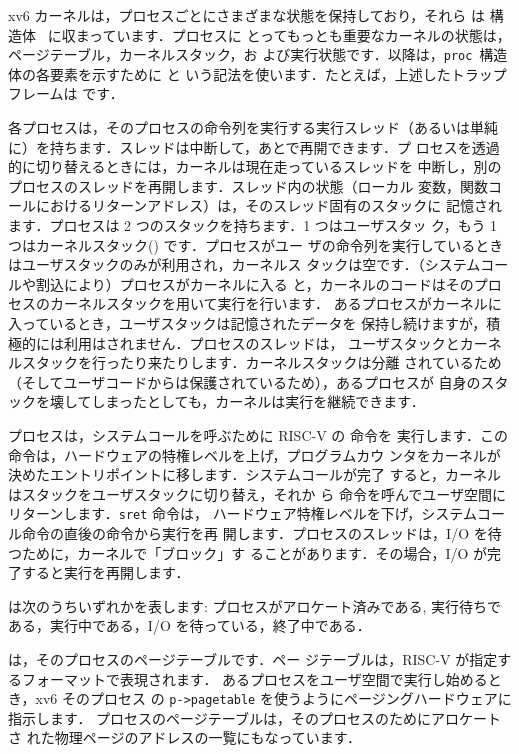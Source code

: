 xv6 カーネルは，プロセスごとにさまざまな状態を保持しており，それら
は 構造体~ に収まっています．プロセスに
とってもっとも重要なカーネルの状態は，ページテーブル，カーネルスタック，お
よび実行状態です．以降は，\lstinline{proc}~構造体の各要素を示すために と
いう記法を使います．たとえば，上述したトラップフレームは  です．

各プロセスは，そのプロセスの命令列を実行する実行スレッド（あるいは単純
に）を持ちます．スレッドは中断して，あとで再開できます．プ
ロセスを透過的に切り替えるときには，カーネルは現在走っているスレッドを
中断し，別のプロセスのスレッドを再開します．スレッド内の状態（ローカル
変数，関数コールにおけるリターンアドレス）は，そのスレッド固有のスタックに
記憶されます．プロセスは 2 つのスタックを持ちます．1 つはユーザスタッ
ク，もう 1 つはカーネルスタック() です．プロセスがユー
ザの命令列を実行しているときはユーザスタックのみが利用され，カーネルス
タックは空です．（システムコールや割込により）プロセスがカーネルに入る
と，カーネルのコードはそのプロセスのカーネルスタックを用いて実行を行います．
あるプロセスがカーネルに入っているとき，ユーザスタックは記憶されたデータを
保持し続けますが，積極的には利用はされません．プロセスのスレッドは，
ユーザスタックとカーネルスタックを行ったり来たりします．カーネルスタックは分離
されているため（そしてユーザコードからは保護されているため），あるプロセスが
自身のスタックを壊してしまったとしても，カーネルは実行を継続できます．

プロセスは，システムコールを呼ぶために RISC-V の  命令を
実行します．この命令は，ハードウェアの特権レベルを上げ，プログラムカウ
ンタをカーネルが決めたエントリポイントに移します．システムコールが完了
すると，カーネルはスタックをユーザスタックに切り替え，それか
ら  命令を呼んでユーザ空間にリターンします．\texttt{sret} 命令は，
ハードウェア特権レベルを下げ，システムコール命令の直後の命令から実行を再
開します．プロセスのスレッドは，I/O を待つために，カーネルで「ブロック」す
ることがあります．その場合，I/O が完了すると実行を再開します．

 は次のうちいずれかを表します: プロセスがアロケート済みである, 
実行待ちである，実行中である，I/O を待っている，終了中である．

 は，そのプロセスのページテーブルです．ペー
ジテーブルは，RISC-V が指定するフォーマットで表現されます．
あるプロセスをユーザ空間で実行し始めるとき，xv6 そのプロセス
の \lstinline{p->pagetable} を使うようにページングハードウェアに指示します．
プロセスのページテーブルは，そのプロセスのためにアロケートさ
れた物理ページのアドレスの一覧にもなっています．


